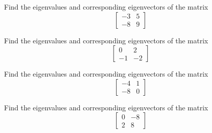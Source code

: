 \documentclass{ximera}
\begin{document}
\begin{exercise}%
    Find the eigenvalues and corresponding eigenvectors of the matrix 
    \[ 
        \begin{bmatrix} -3 & 5 \\ -8 & 9 \end{bmatrix} 
    \]
\end{exercise}

\begin{exercise}%
    Find the eigenvalues and corresponding eigenvectors of the matrix 
    \[ 
        \begin{bmatrix} 0 & 2 \\ -1 & -2 \end{bmatrix} 
    \]
\end{exercise}

\begin{exercise}%
    Find the eigenvalues and corresponding eigenvectors of the matrix 
    \[ 
        \begin{bmatrix} -4 & 1 \\ -8 & 0 \end{bmatrix} 
    \]
\end{exercise}

\begin{exercise}%
    Find the eigenvalues and corresponding eigenvectors of the matrix 
    \[ 
        \begin{bmatrix} 0 & -8 \\ 2 & 8 \end{bmatrix} 
    \]
\end{exercise}
\end{document}
